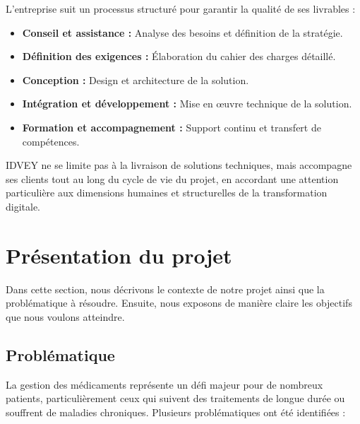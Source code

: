 L'entreprise suit un processus structuré pour garantir la qualité de ses livrables :

\begin{itemize}
    \item \textbf{Conseil et assistance :} Analyse des besoins et définition de la stratégie.
    \item \textbf{Définition des exigences :} Élaboration du cahier des charges détaillé.
    \item \textbf{Conception :} Design et architecture de la solution.
    \item \textbf{Intégration et développement :} Mise en œuvre technique de la solution.
    \item \textbf{Formation et accompagnement :} Support continu et transfert de compétences.
\end{itemize}

IDVEY ne se limite pas à la livraison de solutions techniques, mais accompagne ses clients tout au long du cycle de vie du projet, en accordant une attention particulière aux dimensions humaines et structurelles de la transformation digitale.

\section{Présentation du projet}
Dans cette section, nous décrivons le contexte de notre projet ainsi que la problématique à résoudre. Ensuite, nous exposons de manière claire les objectifs que nous voulons atteindre.

\subsection{Problématique}
La gestion des médicaments représente un défi majeur pour de nombreux patients, particulièrement ceux qui suivent des traitements de longue durée ou souffrent de maladies chroniques. Plusieurs problématiques ont été identifiées :

